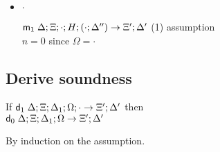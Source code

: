 \documentclass[9pt]{article}
\begin{document}
\begin{itemize}
\item $\cdot$

$\mathsf{m}_1 \; \Delta ; \Xi; \cdot ; H; (\cdot ; \Delta'') \rightarrow \Xi'; \Delta'$ \hfill (1) assumption \\
$n = 0$ \hfill since $\Omega = \cdot$ \\

\end{itemize}

\subsection{Derive soundness}

If $\mathsf{d}_1 \; \Delta; \Xi; \Delta_1; \Omega; \cdot \rightarrow \Xi'; \Delta'$ then \\
$\mathsf{d}_0 \; \Delta; \Xi; \Delta_1; \Omega \rightarrow \Xi'; \Delta'$


By induction on the assumption.
\end{document}

